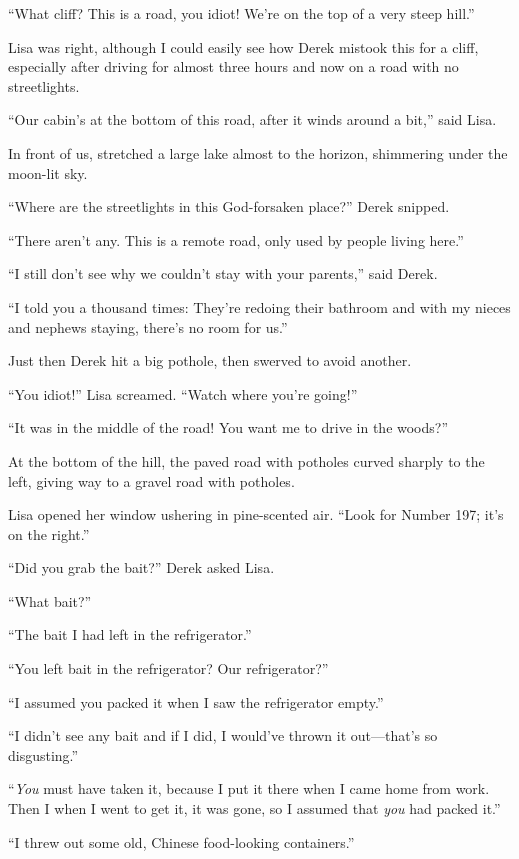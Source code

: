 ``What cliff? This is a road, you idiot! We're on the top of a very
steep hill.''

Lisa was right, although I could easily see how Derek mistook this for a
cliff, especially after driving for almost three hours and now on a road
with no streetlights.

``Our cabin's at the bottom of this road, after it winds around a bit,''
said Lisa.

In front of us, stretched a large lake almost to the horizon, shimmering
under the moon-lit sky.

``Where are the streetlights in this God-forsaken place?'' Derek
snipped.

``There aren't any. This is a remote road, only used by people living
here.''

``I still don't see why we couldn't stay with your parents,'' said
Derek.

``I told you a thousand times: They're redoing their bathroom and with
my nieces and nephews staying, there's no room for us.''

Just then Derek hit a big pothole, then swerved to avoid another.

``You idiot!'' Lisa screamed. ``Watch where you're going!''

``It was in the middle of the road! You want me to drive in the woods?''

At the bottom of the hill, the paved road with potholes curved sharply
to the left, giving way to a gravel road with potholes.

Lisa opened her window ushering in pine-scented air. ``Look for Number
197; it's on the right.''

``Did you grab the bait?'' Derek asked Lisa.

``What bait?''

``The bait I had left in the refrigerator.''

``You left bait in the refrigerator? Our refrigerator?''

``I assumed you packed it when I saw the refrigerator empty.''

``I didn't see any bait and if I did, I would've thrown it out---that's
so disgusting.''

``\emph{You} must have taken it, because I put it there when I came home
from work. Then I when I went to get it, it was gone, so I assumed that
\emph{you} had packed it.''

``I threw out some old, Chinese food-looking containers.''

